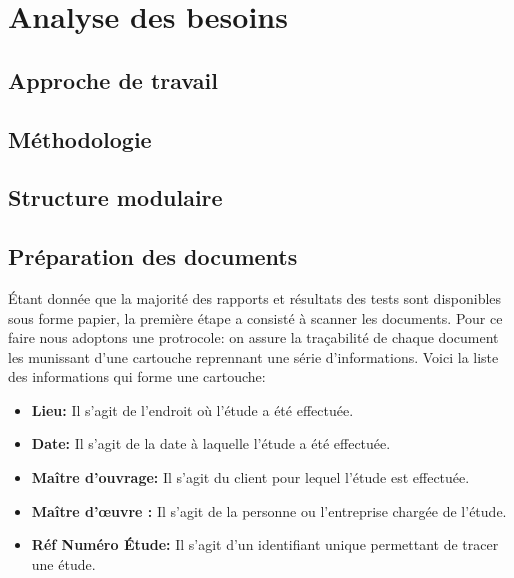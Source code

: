 \chapter{Analyse des besoins}
        
                \lipsum[1]
        \section{Approche de travail}
                \lipsum[1]
        \section{Méthodologie}
                \lipsum[1]
        \section{Structure modulaire}
                \lipsum[1]
        \section{Préparation des documents}
                \par
                Étant donnée que la majorité des rapports et résultats des tests sont 
                disponibles sous forme papier, la première étape a consisté à scanner les documents.
                Pour ce faire nous adoptons une protrocole: on assure la traçabilité de chaque 
                document les munissant d'une cartouche reprennant une série d'informations.
                Voici la liste des informations qui forme une cartouche:
                \begin{itemize}
                        \item \textbf{Lieu: }
                        Il s'agit de l'endroit où l'étude a été effectuée.
                        \item \textbf{Date: }
                        Il s'agit de la date à laquelle l'étude a été effectuée.
                        \item \textbf{Maître d'ouvrage: }
                        Il s'agit du client pour lequel l'étude est effectuée.
                        \item \textbf{Maître d'œuvre : }
                        Il s'agit de la personne ou l'entreprise chargée de l'étude.
                        \item \textbf{Réf Numéro Étude: }
                        Il s'agit d'un identifiant unique permettant de tracer une étude.
                \end{itemize}
                
